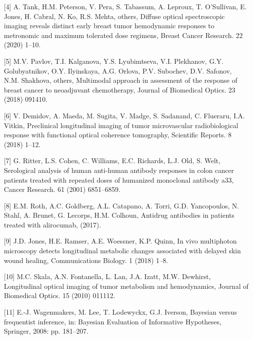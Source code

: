 \documentclass[
]{article}
\begin{document}
\leavevmode\hypertarget{ref-tank2020}{}%
{[}4{]} A. Tank, H.M. Peterson, V. Pera, S. Tabassum, A. Leproux, T. O'Sullivan, E. Jones, H. Cabral, N. Ko, R.S. Mehta, others, Diffuse optical spectroscopic imaging reveals distinct early breast tumor hemodynamic responses to metronomic and maximum tolerated dose regimens, Breast Cancer Research. 22 (2020) 1--10.

\leavevmode\hypertarget{ref-pavlov2018}{}%
{[}5{]} M.V. Pavlov, T.I. Kalganova, Y.S. Lyubimtseva, V.I. Plekhanov, G.Y. Golubyatnikov, O.Y. Ilyinskaya, A.G. Orlova, P.V. Subochev, D.V. Safonov, N.M. Shakhova, others, Multimodal approach in assessment of the response of breast cancer to neoadjuvant chemotherapy, Journal of Biomedical Optics. 23 (2018) 091410.

\leavevmode\hypertarget{ref-demidov2018}{}%
{[}6{]} V. Demidov, A. Maeda, M. Sugita, V. Madge, S. Sadanand, C. Flueraru, I.A. Vitkin, Preclinical longitudinal imaging of tumor microvascular radiobiological response with functional optical coherence tomography, Scientific Reports. 8 (2018) 1--12.

\leavevmode\hypertarget{ref-ritter2001}{}%
{[}7{]} G. Ritter, L.S. Cohen, C. Williams, E.C. Richards, L.J. Old, S. Welt, Serological analysis of human anti-human antibody responses in colon cancer patients treated with repeated doses of humanized monoclonal antibody a33, Cancer Research. 61 (2001) 6851--6859.

\leavevmode\hypertarget{ref-roth2017}{}%
{[}8{]} E.M. Roth, A.C. Goldberg, A.L. Catapano, A. Torri, G.D. Yancopoulos, N. Stahl, A. Brunet, G. Lecorps, H.M. Colhoun, Antidrug antibodies in patients treated with alirocumab, (2017).

\leavevmode\hypertarget{ref-jones2018}{}%
{[}9{]} J.D. Jones, H.E. Ramser, A.E. Woessner, K.P. Quinn, In vivo multiphoton microscopy detects longitudinal metabolic changes associated with delayed skin wound healing, Communications Biology. 1 (2018) 1--8.

\leavevmode\hypertarget{ref-skala2010}{}%
{[}10{]} M.C. Skala, A.N. Fontanella, L. Lan, J.A. Izatt, M.W. Dewhirst, Longitudinal optical imaging of tumor metabolism and hemodynamics, Journal of Biomedical Optics. 15 (2010) 011112.

\leavevmode\hypertarget{ref-wagenmakers2008}{}%
{[}11{]} E.-J. Wagenmakers, M. Lee, T. Lodewyckx, G.J. Iverson, Bayesian versus frequentist inference, in: Bayesian Evaluation of Informative Hypotheses, Springer, 2008: pp. 181--207.
\end{document}
